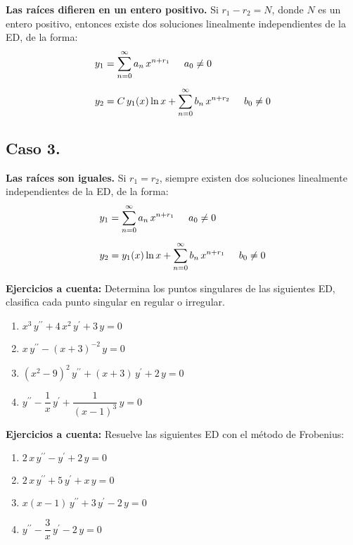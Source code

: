 \textbf{Las raíces difieren en un entero positivo.} Si $r_{1} - r_{2} = N$, donde $N$ es un entero positivo, entonces existe dos soluciones linealmente independientes de la ED, de la forma:
\begin{subequations}
\begin{align}
y_{1} &= \sum_{n=0}^{\infty} a_{n} \, x^{n+r_{1}} \hspace{0.5cm} a_{0} \neq 0 \label{eq:ecuacion_20a} \\[0.5em]
y_{2} &= C \, y_{1} (x) \ln x + \sum_{n=0}^{\infty} b_{n} \, x^{n+r_{2}} \hspace{0.5cm} b_{0} \neq 0 \label{eq:ecuacion_20b}
\end{align}
\end{subequations}

\subsection*{Caso 3.}

\textbf{Las raíces son iguales.} Si $r_{1} = r_{2}$, siempre existen dos soluciones linealmente independientes de la ED, de la forma:
\begin{subequations}
\begin{align}
y_{1} &= \sum_{n=0}^{\infty} a_{n} \, x^{n+r_{1}} \hspace{0.5cm} a_{0} \neq 0 \label{eq:ecuacion_21a} \\[0.5em]
y_{2} &= y_{1} (x) \ln x + \sum_{n=0}^{\infty} b_{n} \, x^{n+r_{1}} \hspace{0.5cm} b_{0} \neq 0 \label{eq:ecuacion_21b}
\end{align}
\end{subequations}

\textbf{Ejercicios a cuenta:}
Determina los puntos singulares de las siguientes ED, clasifica cada punto singular en regular o irregular.
\begin{enumerate}
\item $x^{3} \, y^{\prime \prime} + 4 \, x^{2} \, y^{\prime} + 3 \, y = 0$
\item $x \, y^{\prime \prime} - (x + 3)^{-2} \, y = 0$
\item $(x^{2} - 9)^{2} \, y^{\prime \prime} + (x + 3) \, y^{\prime} + 2 \, y = 0$
\item $y^{\prime \prime} - \dfrac{1}{x} \, y^{\prime} + \dfrac{1}{(x - 1)^{3}} \, y = 0$
\end{enumerate}

\textbf{Ejercicios a cuenta:}
Resuelve las siguientes ED con el método de Frobenius:
\begin{enumerate}
\item $2 \, x \, y^{\prime \prime} - y^{\prime} + 2 \, y = 0$
\item $2 \, x \, y^{\prime \prime} + 5 \, y^{\prime} + x \, y = 0$
\item $x (x - 1) \, y^{\prime \prime} + 3 \, y^{\prime} - 2 \, y = 0$
\item $y^{\prime \prime} - \dfrac{3}{x} \, y^{\prime} - 2 \, y = 0$
\end{enumerate}

